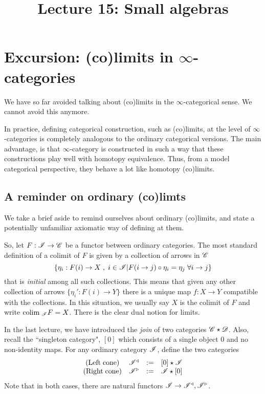 \documentclass[11pt]{amsart}
\title{Lecture 15: Small algebras}
\def\colim{{\rm colim}\;}
\def\lcone{\triangleleft}
\def\rcone{\triangleright}
\begin{document}
\maketitle

\section{Excursion: (co)limits in $\infty$-categories}

We have so far avoided talking about (co)limits in the $\infty$-categorical sense. 
We cannot avoid this anymore. 

In practice, defining categorical construction, such as (co)limits, at the level of $\infty$-categories is completely analogous to the ordinary categorical versions. 
The main advantage, is that $\infty$-category is constructed in such a way that these constructions play well with homotopy equivalence.
Thus, from a model categorical perspective, they behave a lot like homotopy (co)limits. 

\subsection{A reminder on ordinary (co)limts}

We take a brief aside to remind ourselves about ordinary (co)limits, and state a potentially unfamiliar axiomatic way of defining at them. 

So, let $F : \mathscr I \to \mathscr C$ be a functor between ordinary categories. 
The most standard definition of a colimit of $F$ is given by a collection of arrows in $\mathscr C$
\[
\{ \eta_{i} : F(i) \to X \;, \; i \in \mathscr I | F(i \to j) \circ \eta_i = \eta_j \; \forall i \to j\}
\]
that is {\em initial} among all such collections. 
This means that given any other collection of arrows $\{\eta_i' : F(i) \to Y\}$ there is a unique map $f : X \to Y$ compatible with the collections. 
In this situation, we usually say $X$ is the colimit of $F$ and write $\colim_\sI F = X$. 
There is the clear dual notion for limits. 

In the last lecture, we have introduced the {\em join} of two categories $\mathscr C \star \mathscr D$. 
Also, recall the ``singleton category", $[0]$ which consists of a single object $0$ and no non-identity maps. 
For any ordinary category $\mathscr I$, define the two categories
\[
\begin{array}{ccccc}
({\rm Left \; cone}) & \sI^{\lcone} & := & [0] \star \sI \\
({\rm Right \; cone}) & \sI^{\rcone} & := & \sI \star [0]
\end{array}
\]
Note that in both cases, there are natural functors $\sI \to \sI^{\lcone} , \sI^{\rcone}$. 
\end{document}
